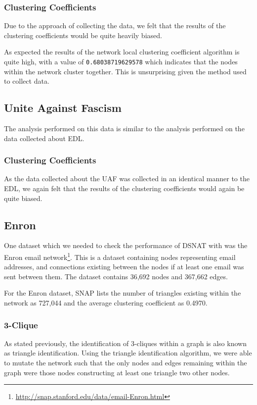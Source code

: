 \subsubsection{Clustering Coefficients}
Due to the approach of collecting the data, we felt that the results of the clustering coefficients would be quite heavily biased. 

As expected the results of the network local clustering coefficient algorithm is quite high, with a value of \verb/0.68038719629578/ which indicates that the nodes within the network cluster together. This is unsurprising given the method used to collect data.

\subsection{Unite Against Fascism}
The analysis performed on this data is similar to the analysis performed on the data collected about EDL.

\subsubsection{Clustering Coefficients}
As the data collected about the UAF was collected in an identical manner to the EDL, we again felt that the results of the clustering coefficients would again be quite biased.

\subsection{Enron}
One dataset which we needed to check the performance of DSNAT with was the Enron email network\footnote{\url{http://snap.stanford.edu/data/email-Enron.html}}. This is a dataset containing nodes representing email addresses, and connections existing between the nodes if at least one email was sent between them. The dataset contains 36,692 nodes and 367,662 edges.

For the Enron dataset, SNAP lists the number of triangles existing within the network as 727,044 and the average clustering coefficient as 0.4970. 

\subsubsection{3-Clique}
As stated previously, the identification of 3-cliques within a graph is also known as triangle identification. Using the triangle identification algorithm, we were able to mutate the network such that the only nodes and edges remaining within the graph were those nodes constructing at least one triangle two other nodes.

